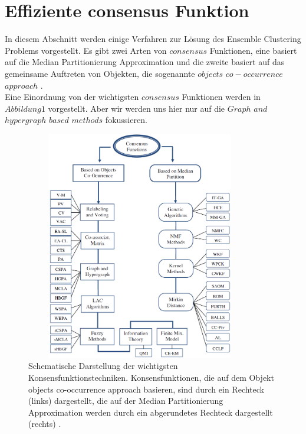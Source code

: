\documentclass[runningheads]{llncs}
\begin{document}
\section{Effiziente consensus Funktion}
In diesem Abschnitt werden einige Verfahren zur Lösung des Ensemble Clustering Problems vorgestellt. 
Es gibt zwei Arten von $consensus$ Funktionen, eine basiert auf die Median Partitionierung Approximation und die zweite basiert auf das gemeinsame Auftreten von Objekten, die sogenannte $objects$ $co-occurrence$ $approach$ \cite{vega2011survey}.\\
Eine Einordnung von der wichtigsten  $consensus$ Funktionen werden in $Abbildung 1$ vorgestellt. Aber wir werden uns hier nur auf die $Graph$ $and$ $hypergraph$ $based$ $methods$ fokussieren.
\begin{figure}[t]
	\begin{center}
		\includegraphics[width=10cm, height=10cm]{Abbildung1}
		\caption{Schematische Darstellung der wichtigsten Konsensfunktionstechniken. Konsensfunktionen, die auf dem Objekt
			objects co-occurrence approach basieren, sind durch ein Rechteck (links) dargestellt, die auf der Median Partitionierung Approximation werden durch ein abgerundetes Rechteck dargestellt (rechts) \cite{vega2011survey}.}
	\end{center}	
\end{figure}
\end{document}
